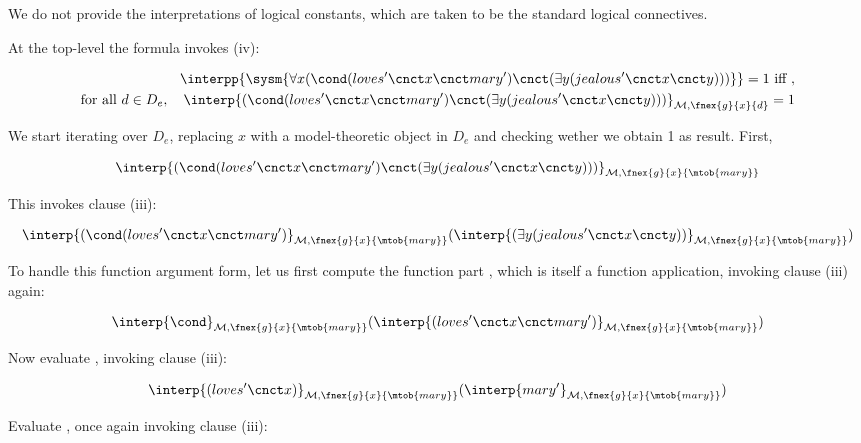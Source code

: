 \documentclass[11pt,a4paper]{article}
\begin{document}
We do not provide the interpretations of logical constants, which are taken to be the standard logical connectives.

At the top-level the formula invokes (iv): 

\begin{align}
\interpp{\sysm{\forall x (\cond (loves'\cnct x\cnct mary')\cnct (\exists y (jealous'\cnct x\cnct y)))}} = 1 \text{ iff }, \\
\text{for all } d \in D_e,\quad \interp{(\cond (loves'\cnct x\cnct mary')\cnct (\exists y (jealous'\cnct x\cnct y)))}_{\mathcal{M},\fnex{g}{x}{d}} = 1
\end{align}

We start iterating over $D_e$, replacing $x$ with a model-theoretic object in $D_e$ and checking wether we obtain 1 as result. First,

\begin{align}
\interp{(\cond (loves'\cnct x\cnct mary')\cnct (\exists y (jealous'\cnct x\cnct y)))}_{\mathcal{M},\fnex{g}{x}{\mtob{mary}}}
\end{align}

This invokes clause (iii):

\begin{align}
\interp{(\cond (loves'\cnct x\cnct mary')}_{\mathcal{M},\fnex{g}{x}{\mtob{mary}}} (\interp{(\exists y (jealous'\cnct x\cnct y))}_{\mathcal{M},\fnex{g}{x}{\mtob{mary}}})
\end{align}

To handle this function argument form, let us first compute the function part  , which is itself a function application, invoking clause (iii) again:

\begin{align}
\interp{\cond}_{\mathcal{M},\fnex{g}{x}{\mtob{mary}}} (\interp{(loves'\cnct x\cnct mary')}_{\mathcal{M},\fnex{g}{x}{\mtob{mary}}})
\end{align}

Now evaluate , invoking clause (iii):

\begin{align}\label{lovesxmary}
\interp{(loves'\cnct x)}_{\mathcal{M},\fnex{g}{x}{\mtob{mary}}} (\interp{mary'}_{\mathcal{M},\fnex{g}{x}{\mtob{mary}}})
\end{align}

Evaluate , once again invoking clause (iii):
\end{document}
